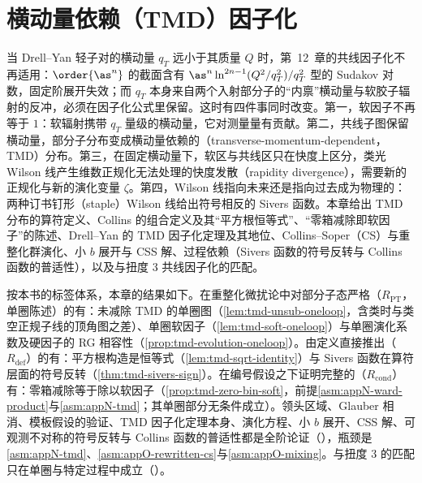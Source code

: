\chapter{横动量依赖（TMD）因子化}\label{ch:tmd}

当 Drell--Yan 轻子对的横动量 $q_T$ 远小于其质量 $Q$ 时，第~12~章的共线因子化不再适用：$\order{\as^n}$ 的截面含有 $\as^n\ln^{2n-1}(Q^2/q_T^2)/q_T^2$ 型的 Sudakov 对数，固定阶展开失效；而 $q_T$ 本身来自两个入射部分子的“内禀”横动量与软胶子辐射的反冲，必须在因子化公式里保留。这时有四件事同时改变。第一，软因子不再等于 $1$：软辐射携带 $q_T$ 量级的横动量，它对测量量有贡献。第二，共线子图保留横动量，部分子分布变成横动量依赖的（transverse-momentum-dependent，TMD）分布。第三，在固定横动量下，软区与共线区只在快度上区分，类光 Wilson 线产生维数正规化无法处理的快度发散（rapidity divergence），需要新的正规化与新的演化变量 $\zeta$。第四，Wilson 线指向未来还是指向过去成为物理的：两种订书钉形（staple）Wilson 线给出符号相反的 Sivers 函数。本章给出 TMD 分布的算符定义、Collins 的组合定义及其“平方根恒等式”、“零箱减除即软因子”的陈述、Drell--Yan 的 TMD 因子化定理及其地位、Collins--Soper（CS）与重整化群演化、小 $b$ 展开与 CSS 解、过程依赖（Sivers 函数的符号反转与 Collins 函数的普适性），以及与扭度 3 共线因子化的匹配。

按本书的标签体系，本章的结果如下。在重整化微扰论中对部分子态严格（$R_{\mathrm{PT}}$，单圈陈述）的有：未减除 TMD 的单圈图（\cref{lem:tmd-unsub-oneloop}，含类时与类空正规子线的顶角图之差）、单圈软因子（\cref{lem:tmd-soft-oneloop}）与单圈演化系数及硬因子的 RG 相容性（\cref{prop:tmd-evolution-oneloop}）。由定义直接推出（$R_{\mathrm{def}}$）的有：平方根构造是恒等式（\cref{lem:tmd-sqrt-identity}）与 Sivers 函数在算符层面的符号反转（\cref{thm:tmd-sivers-sign}）。在编号假设之下证明完整的（$R_{\mathrm{cond}}$）有：零箱减除等于除以软因子（\cref{prop:tmd-zero-bin-soft}，前提\cref{asm:appN-ward-product}与\cref{asm:appN-tmd}；其单圈部分无条件成立）。领头区域、Glauber 相消、模板假设的验证、TMD 因子化定理本身、演化方程、小 $b$ 展开、CSS 解、可观测不对称的符号反转与 Collins 函数的普适性都是全阶论证（\tagA），瓶颈是\cref{asm:appN-tmd}、\cref{asm:appO-rewritten-cs}与\cref{asm:appO-mixing}。与扭度 3 的匹配只在单圈与特定过程中成立（\tagP）。

